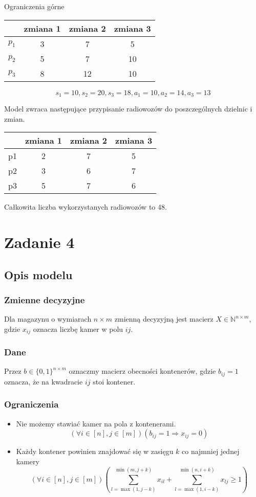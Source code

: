 \documentclass{article}
\begin{document}
\begin{center}
Ograniczenia górne
\end{center}
\begin{center}
\begin{tabular}{c c c c}
 & zmiana 1 & zmiana 2 & zmiana 3\\
 \hline
$p_1$ & 3 & 7 & 5\\
\hline
$p_2$ & 5 & 7 & 10 \\
\hline
$p_3$ & 8 & 12 & 10 \\
\hline
\end{tabular}
\end{center}

\[s_1 = 10, s_2 = 20, s_3 = 18, a_1=10, a_2=14, a_3=13\]

Model zwraca następujące przypisanie radiowozów do poszczególnych dzielnic i zmian.
\begin{center}
\begin{tabular}{| c | c c c |}
\hline
 & zmiana 1 & zmiana 2 & zmiana 3\\
\hline
p1 & 2 & 7 & 5\\
p2 & 3 & 6 & 7 \\
p3 & 5 & 7 & 6 \\
\hline
\end{tabular}
\end{center}
Całkowita liczba wykorzystanych radiowozów to 48.

\section{Zadanie 4}
\subsection{Opis modelu}
\subsubsection{Zmienne decyzyjne}
Dla magazynu o wymiarach \(n\times m\) zmienną decyzyjną jest macierz \(X\in \mathbb{N}^{n\times m}\), gdzie \(x_{ij}\) oznacza liczbę kamer w polu \(ij\).

\subsubsection{Dane}
Przez $b\in \{0,1\}^{n\times m}$ oznaczmy macierz obecności kontenerów, gdzie $b_{ij} = 1$ oznacza, że na kwadracie $ij$ stoi kontener.

\subsubsection{Ograniczenia}
\begin{itemize}
\item Nie możemy stawiać kamer na pola z kontenerami.
\[(\forall i\in [n], j\in[m])(b_{ij} = 1 \Rightarrow x_{ij} = 0)\]
\item Każdy kontener powinien znajdować się w zasięgu \(k\) co najmniej jednej kamery
\[(\forall i\in [n], j\in[m])\left(\sum_{l=\max(1, j-k)}^{ \min(m, j+k)}x_{il} + 
\sum_{l=\max(1, i-k)}^{ \min(n, i+k) }x_{lj}\geq 1 \right)\]
\end{itemize}
\end{document}
